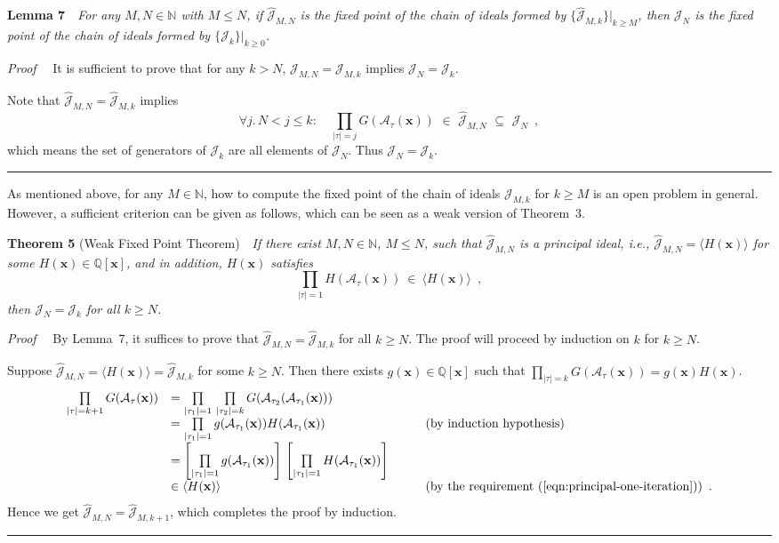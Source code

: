 \documentclass{article}
\newcommand{\rulex}{\hfill\rule{1mm}{3mm}}
\newcommand{\A}{\mathcal{A}}
\newcommand{\J}{\mathcal{J}}
\newcommand{\xx}{\mathbf{x}}
\begin{document}
{\bf Lemma 7}~~{\it For any $M,N \in \mathbb{N}$ with $M \leq N$, if $\hat{\J}_{M,N}$ is the fixed point of the chain of ideals formed by $\{\hat{\J}_{M,k}\}|_{k \geq M}$, then $\J_N$ is the fixed point of the chain of ideals formed by $\{\J_k\}|_{k \geq 0}$.}

{\it Proof}~~ It is sufficient to prove that for any $k> N$, $\hat{\J}_{M,N}=\hat{\J}_{M,k}$ implies $\J_N=\J_k$.

Note that $\hat{\J}_{M,N}=\hat{\J}_{M,k}$ implies
\[
\forall j. \,N<j \leq k: \quad \prod_{|\tau|=j} G(\A_{\tau}(\xx))\,\,\in \,\,\hat{\J}_{M,N}\,\,\subseteq\,\, \J_N  \enspace ,
\]
which means the set of generators of $\J_k$ are all elements of $\J_N$. Thus $\J_N=\J_k$. \rulex

As mentioned above, for any $M \in \mathbb{N}$, how to compute the fixed point of the chain of ideals $\J_{M,k}$ for $k \geq M$ is an open problem in general. However, a sufficient criterion can be given as follows, which can be seen as a weak version of Theorem~3.

{\bf Theorem 5} (Weak Fixed Point Theorem)~~{\it If there exist $M,N \in \mathbb{N}$, $M\leq N$, such that $\hat{\J}_{M,N}$ is a principal ideal, i.e., $\hat{\J}_{M,N}=\langle H(\xx)\rangle$ for some $H(\xx) \in \mathbb{Q}[\xx]$, and in addition, $H(\xx)$ satisfies
\begin{equation}\label{eqn:principal-one-iteration}
\prod_{|\tau|=1} H(\A_{\tau}(\xx)) \ \in \ \langle H(\xx) \rangle \enspace ,
\end{equation}
then $\J_N=\J_k$ for all $k \geq N$.}

{\it Proof}~~ By Lemma~7, it suffices to prove that $\hat{\J}_{M,N} = \hat{\J}_{M,k}$ for all $k \geq N$. The proof will proceed by induction on $k$ for $k \geq N$.

Suppose $\hat{\J}_{M,N}=\langle H(\xx) \rangle= \hat{\J}_{M,k}$ for some $k \geq N$. Then there exists $g(\xx) \in \mathbb{Q}[\xx]$ such that $\prod_{|\tau|=k} G(\A_{\tau}(\xx)) = g(\xx)H(\xx)$.
\[
\begin{array}{lll}
\prod\limits_{|\tau|=k+1} G(\A_{\tau}(\xx)) & = \prod\limits_{|\tau_1|=1}\, \prod\limits_{|\tau_2|=k} G(\A_{\tau_2}(\A_{\tau_1}(\xx))) \\
& = \prod\limits_{|\tau_1|=1} g(\A_{\tau_1}(\xx)) H(\A_{\tau_1}(\xx)) & \qquad \mbox{(by induction hypothesis)} \\
& = \left[ \prod\limits_{|\tau_1|=1} g(\A_{\tau_1}(\xx)) \right] \, \left[ \prod\limits_{|\tau_1|=1} H(\A_{\tau_1}(\xx)) \right] \\
& \in \langle H(\xx) \rangle & \qquad \mbox{(by the requirement~(\ref{eqn:principal-one-iteration}))} \enspace .
\end{array}
\]
Hence we get $\hat{\J}_{M,N}= \hat{\J}_{M,k+1}$, which completes the proof by induction. \rulex
\end{document}
